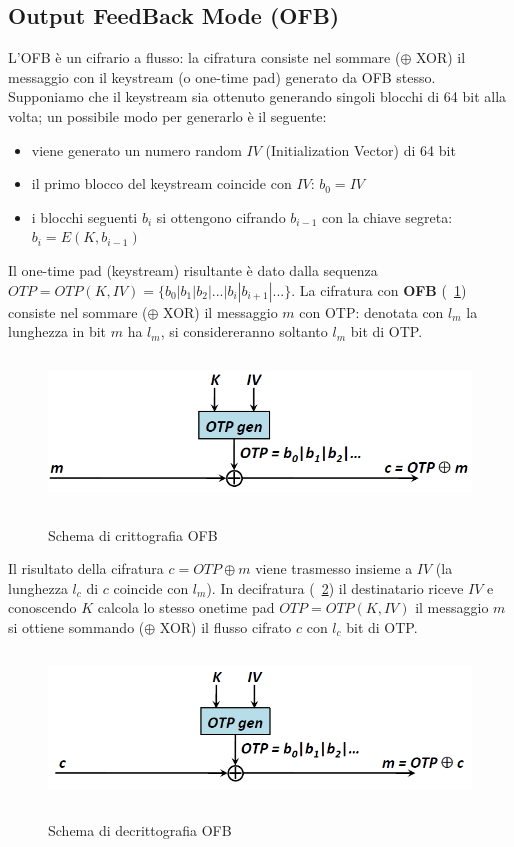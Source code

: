 \subsection{Output FeedBack Mode (OFB)} \label{par:ofb}
L'OFB è un cifrario a flusso: la cifratura consiste nel sommare ($\oplus$ XOR) il messaggio con il keystream (o one-time pad) generato da OFB stesso. Supponiamo che il keystream sia ottenuto generando singoli blocchi di 64 bit alla volta; un possibile modo per generarlo è il seguente:
\begin{itemize}
	\item viene generato un numero random $IV$ (Initialization Vector) di 64 bit
	\item il primo blocco del keystream coincide con $IV$: $b_{0} = IV$
	\item i blocchi seguenti $b_{i}$ si ottengono cifrando $b_{i-1}$ con la chiave segreta: $b_{i} = E(K,b_{i-1})$
\end{itemize}
Il one-time pad (keystream) risultante è dato dalla sequenza $OTP = OTP(K, IV) = \{b_{0}|b_{1}|b_{2}|...|b_{i}|b_{i+1}|...\}$. La cifratura con \textbf{OFB} (\figurename ~\ref{fig:OFB_enc}) consiste nel sommare ($\oplus$ XOR) il messaggio $m$ con OTP: denotata con $l_{m}$ la lunghezza in bit $m$ ha  $l_{m}$, si considereranno soltanto $l_{m}$ bit di OTP.
\begin{figure}[htbp]
	\centering%
	\subfigure%
	{\includegraphics[height=4cm, width=12cm, keepaspectratio]{Immagini/modalita_operative/OFB_enc.png}}
	\caption{Schema di crittografia OFB \label{fig:OFB_enc}} 	
\end{figure}
Il risultato della cifratura $c = OTP \oplus m$ viene trasmesso insieme a $IV$ (la lunghezza $l_{c}$ di $c$ coincide con $l_{m}$).\newline
In decifratura (\figurename ~\ref{fig:OFB_dec}) il destinatario riceve $IV$ e conoscendo $K$ calcola lo stesso onetime pad $OTP = OTP(K, IV)$  il messaggio $m$ si ottiene sommando ($\oplus$ XOR) il flusso cifrato $c$ con $l_{c}$ bit di OTP.
\begin{figure}[htbp]
	\centering%
	\subfigure%
	{\includegraphics[height=4cm, width=12cm, keepaspectratio]{Immagini/modalita_operative/OFB_dec.png}}
	\caption{Schema di decrittografia OFB \label{fig:OFB_dec}} 	
\end{figure}
